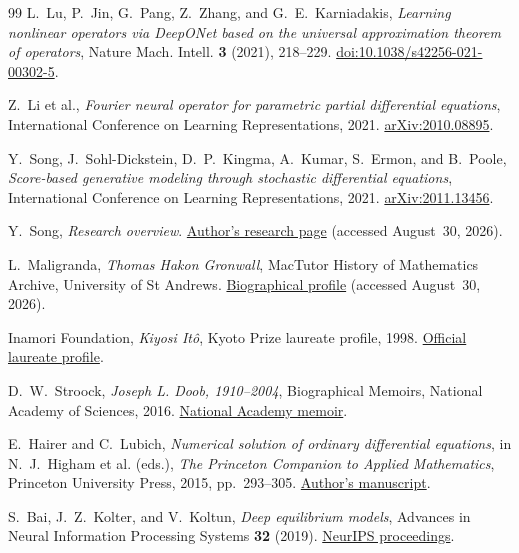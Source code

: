 \documentclass[11pt]{amsart}
\numberwithin{equation}{section}
\theoremstyle{plain}
\begin{document}
\begin{thebibliography}{99}
L.~Lu, P.~Jin, G.~Pang, Z.~Zhang, and G.~E.~Karniadakis,
\emph{Learning nonlinear operators via DeepONet based on the universal
approximation theorem of operators},
Nature Mach. Intell. \textbf{3} (2021), 218--229.
\href{https://doi.org/10.1038/s42256-021-00302-5}
{doi:10.1038/s42256-021-00302-5}.

Z.~Li et al.,
\emph{Fourier neural operator for parametric partial differential equations},
International Conference on Learning Representations, 2021.
\href{https://arxiv.org/abs/2010.08895}{arXiv:2010.08895}.

Y.~Song, J.~Sohl-Dickstein, D.~P.~Kingma, A.~Kumar, S.~Ermon, and B.~Poole,
\emph{Score-based generative modeling through stochastic differential
equations},
International Conference on Learning Representations, 2021.
\href{https://arxiv.org/abs/2011.13456}{arXiv:2011.13456}.

Y.~Song,
\emph{Research overview}.
\href{https://yang-song.net/}{Author's research page}
(accessed August~30, 2026).

L.~Maligranda,
\emph{Thomas Hakon Gronwall}, MacTutor History of Mathematics Archive,
University of St Andrews.
\href{https://mathshistory.st-andrews.ac.uk/Biographies/Gronwall/}
{Biographical profile} (accessed August~30, 2026).

Inamori Foundation,
\emph{Kiyosi It\^o}, Kyoto Prize laureate profile, 1998.
\href{https://www.kyotoprize.org/en/laureates/kiyosi_ito/}
{Official laureate profile}.

D.~W.~Stroock,
\emph{Joseph L. Doob, 1910--2004},
Biographical Memoirs, National Academy of Sciences, 2016.
\href{https://www.nasonline.org/wp-content/uploads/2024/06/doob-joseph.pdf}
{National Academy memoir}.

E.~Hairer and C.~Lubich,
\emph{Numerical solution of ordinary differential equations},
in N.~J.~Higham et al. (eds.), \emph{The Princeton Companion to Applied Mathematics},
Princeton University Press, 2015, pp.~293--305.
\href{https://www.unige.ch/~hairer/preprints/pcam-ode.pdf}{Author's manuscript}.

S.~Bai, J.~Z.~Kolter, and V.~Koltun,
\emph{Deep equilibrium models},
Advances in Neural Information Processing Systems \textbf{32} (2019).
\href{https://papers.nips.cc/paper_files/paper/2019/hash/01386bd6d8e091c2ab4c7c7de644d37b-Abstract.html}
{NeurIPS proceedings}.


\end{thebibliography}
\end{document}
